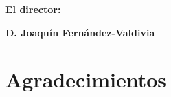 \textbf{El director:}
\vspace{4cm}

\noindent 
\textbf{D. Joaquín Fernández-Valdivia}%



\chapter*{Agradecimientos}
\thispagestyle{empty}
\vspace{1cm}


\vspace{3cm}

